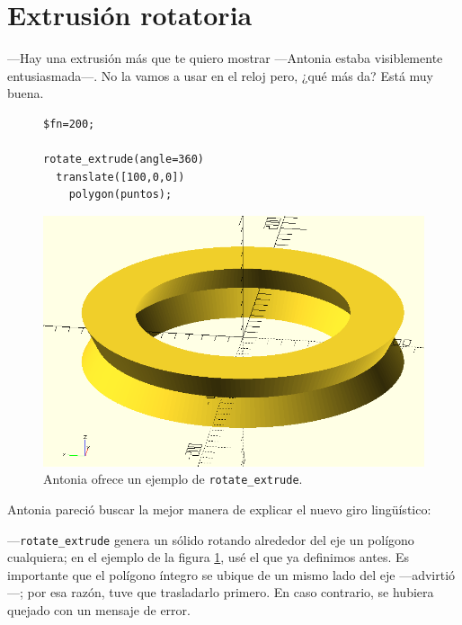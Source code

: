 \section{Extrusión rotatoria}

---Hay una extrusión más que te quiero mostrar ---An\-to\-nia estaba
visiblemente entusiasmada---. No la vamos a usar en el reloj pero,
¿qué más da? Está muy buena.

  \begin{figure}[ht]
  \begin{minipage}[]{.55\textwidth}%
    \begin{lstlisting}
$fn=200;

rotate_extrude(angle=360)
  translate([100,0,0])
    polygon(puntos);
    \end{lstlisting}%
  \end{minipage}\hfill
  \begin{minipage}[]{.45\textwidth}%
      \flushright
      \includegraphics[width=\textwidth]{imagenes/extrusion-rotativa-1}
    \end{minipage}
    \caption{Antonia ofrece un ejemplo de \lstinline!rotate_extrude!.}
    \label{fig:extrusion-rotativa-1}
  \end{figure}


  Antonia pareció buscar la mejor manera de explicar el nuevo giro
  lingüístico:

  ---\lstinline!rotate_extrude! genera un sólido rotando alrededor del
  eje  un polígono cualquiera; en el ejemplo de la figura
  \ref{fig:extrusion-rotativa-1}, usé el que ya definimos antes. Es
  importante que el polígono íntegro se ubique de un mismo lado del
  eje  ---advirtió---; por esa razón, tuve que trasladarlo
  primero. En caso contrario, \openscad{} se hubiera quejado con un
  mensaje de error.


